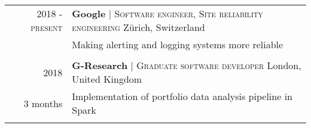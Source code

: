 \documentclass[a4paper,10pt]{article} %
\begin{document}
\begin{tabularx}{\textwidth}{p{0.19cm}r|X}

    \multicolumn{2}{r|}{2018 - \textsc{present}} & \textbf{\large Google} \hspace{0.2cm} | \hspace{0.01cm} \textsc{Software engineer, Site reliability engineering} \hfill Zürich, Switzerland                                                                                                                                                \\
                                                 &                                                                                                                                             & Making alerting and logging systems more reliable                                                                                            \\
    \multicolumn{2}{c}{\vspace{-0.2cm}}                                                                                                                                                                                                                                                                                                       \\

    \multicolumn{2}{r|}{2018}                    & \textbf{\large G-Research} \hspace{0.2cm} | \hspace{0.01cm} \textsc{Graduate software developer} \hfill London, United Kingdom                                                                                                                                                             \\
                                                 & 3 months                                                                                                                                    & Implementation of portfolio data analysis pipeline in Spark                                                                                  \\
    \multicolumn{2}{c}{\vspace{-0.2cm}}                                                                                                                                                                                                                                                                                                       \\


\end{tabularx}
\end{document}
